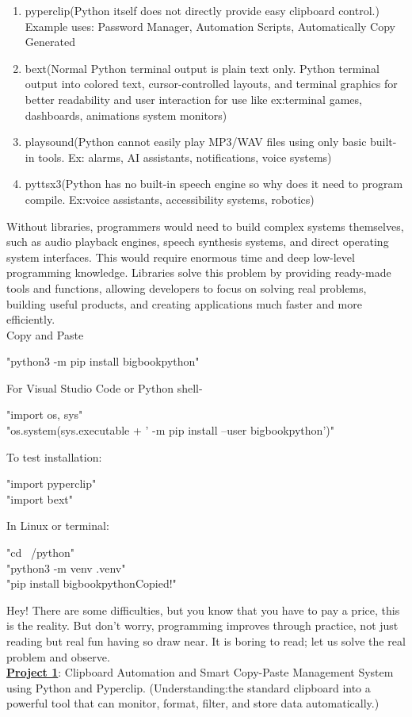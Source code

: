 \documentclass{book}
\begin{document}
\begin{enumerate}
    \item pyperclip(Python itself does not directly provide easy clipboard control.)\\Example uses: Password Manager, Automation Scripts, Automatically Copy Generated
    \item bext(Normal Python terminal output is plain text only. Python terminal output into colored text, cursor-controlled layouts, and terminal graphics for better readability and user interaction for use like ex:terminal games, dashboards, animations system monitors)
    \item playsound(Python cannot easily play MP3/WAV files using only basic built-in tools. Ex: alarms, AI assistants, notifications, voice systems)
    \item pyttsx3(Python has no built-in speech engine so why does it need to program compile. Ex:voice assistants, accessibility systems, robotics)
\end{enumerate} 
Without libraries, programmers would need to build complex systems themselves, such as audio playback engines, speech synthesis systems, and direct operating system interfaces. This would require enormous time and deep low-level programming knowledge. Libraries solve this problem by providing ready-made tools and functions, allowing developers to focus on solving real problems, building useful products, and creating applications much faster and more efficiently.\\
Copy and Paste
\begin{center}
    "python3 -m pip install bigbookpython"
\end{center}
For Visual Studio Code or Python shell-
\begin{center}
    "import os, sys"\\
    "os.system(sys.executable + ' -m pip install --user bigbookpython')"
\end{center}
To test installation:
\begin{center}
    "import pyperclip"\\
    "import bext"
\end{center}
In Linux or terminal: 
\begin{center}
    "cd ~/python"\\  
    "python3 -m venv .venv"\\
    "pip install bigbookpythonCopied!"   
\end{center}
Hey! There are some difficulties, but you know that you have to pay a price, this is the reality. But don't worry, programming improves through practice, not just reading but real fun having so draw near. It is boring to read; let us solve the real problem and observe.\\
\uline{\textbf{Project 1}}: Clipboard Automation and Smart Copy-Paste Management System using Python and Pyperclip. (Understanding:the standard clipboard into a powerful tool that can monitor, format, filter, and store data automatically.)
\end{document}
